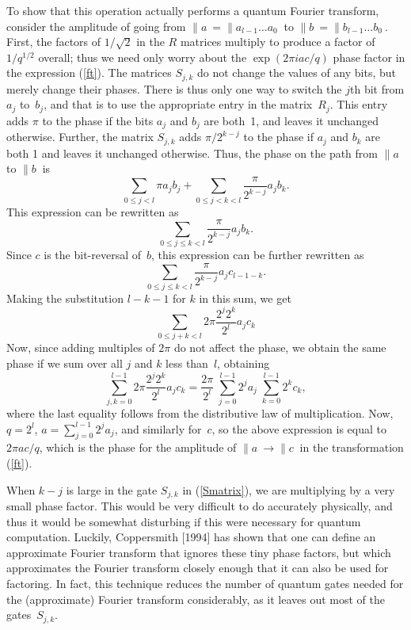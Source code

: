 To show that this operation actually performs a quantum Fourier transform,
consider the amplitude of going from $\|a\> = \|a_{l-1} \ldots a_0\>$
to $\|b\> = \|b_{l-1} \ldots b_0\>$.  First, the factors of $1/\sqrt{2}$
in the $R$ matrices multiply to produce a factor of $1/q^{1/2}$ overall;
thus we need only worry about the $\exp(2 \pi i ac/q)$ phase 
factor in the
expression (\ref{ft}).  The matrices $S_{j,k}$ do not change the values of 
any bits, but merely change their phases.  There is thus only one way to 
switch the $j$th bit from $a_j$ to~$b_j$, and that is to use the appropriate
entry in the matrix~$R_j$.  This entry adds $\pi$ to the phase if the
bits $a_j$ and $b_j$ are both~1, and leaves it unchanged otherwise.
Further, the matrix $S_{j,k}$ adds $\pi/2^{k-j}$
to the phase if $a_j$ and $b_k$ are both 1 and leaves it unchanged otherwise.
Thus, the phase on the path from $\|a\>$ to $\|b\>$ is
\begin{equation}
\sum_{0 \leq j < l} \pi a_jb_j + 
\sum_{0\leq j<k < l} \frac{\pi}{2^{k-j}} a_j b_k.
\end{equation}
This expression can be rewritten as
\begin{equation}
 \sum_{0 \leq j \leq k < l} \frac{\pi}{2^{k-j}} a_j b_k.
\end{equation}
Since $c$ is the bit-reversal of~$b$, this expression can be 
further rewritten as
\begin{equation}
 \sum_{0 \leq j \leq k < l} \frac{\pi}{2^{k-j}} a_j c_{l-1-k}.
\end{equation}
Making the substitution $l-k-1$ for $k$ in this sum, we get 
\begin{equation}
 \sum_{0 \leq j+k < l} 2 \pi \frac{2^j 2^k}{2^l} a_j c_{k} 
\end{equation}
Now, since adding multiples of $2 \pi$ do not affect the phase, we obtain
the same phase if we sum over all $j$ and $k$ less than~$l$, obtaining
\begin{equation}
 \sum_{j,k =0}^{l-1} 2 \pi \frac{2^j 2^k}{2^l} a_j c_{k} = \frac{2\pi}{2^l}\;
\sum_{j=0}^{l-1} 2^j a_j \;\sum_{k=0}^{l-1} 2^k c_k,
\end{equation}
where the last equality follows
from the distributive law of multiplication.
Now, $q=2^l$, $a = \sum_{j=0}^{l-1}2^j a_j$, and similarly for~$c$, so 
the above expression is equal to
$2 \pi ac/q$,
which is the phase for the amplitude of $\|a\> \rightarrow \|c\>$ in
the transformation (\ref{ft}).

When $k-j$ is large in the gate $S_{j,k}$ in (\ref{Smatrix}), we are 
multiplying by a 
very small phase factor.  This would be very difficult to do
accurately physically, and thus it would be somewhat disturbing if this
were necessary for quantum computation.  Luckily, Coppersmith [1994]
has shown that one can define an approximate Fourier transform that ignores
these tiny phase factors, but which approximates the Fourier transform
closely enough that it can also be used for factoring.  In fact,
this technique reduces the number of quantum gates needed for the
(approximate) Fourier transform considerably, as it leaves out most of
the gates~$S_{j,k}$.

